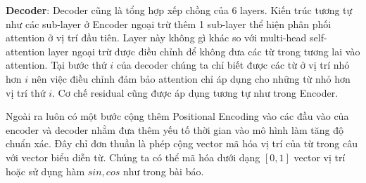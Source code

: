 \textbf{Decoder}: Decoder cũng là tổng hợp xếp chồng của 6 layers. Kiến trúc tương tự như các sub-layer ở Encoder ngoại trừ thêm 1 sub-layer thể hiện phân phối attention ở vị trí đầu tiên. Layer này không gì khác so với multi-head self-attention layer ngoại trừ được điều chỉnh để không đưa các từ trong tương lai vào attention. Tại bước thứ $i$ của decoder chúng ta chỉ biết được các từ ở vị trí nhỏ hơn $i$ nên việc điều chỉnh đảm bảo attention chỉ áp dụng cho những từ nhỏ hơn vị trí thứ $i$. Cơ chế residual cũng được áp dụng tương tự như trong Encoder.

Ngoài ra luôn có một bước cộng thêm Positional Encoding vào các đầu vào của encoder và decoder nhằm đưa thêm yếu tố thời gian vào mô hình làm tăng độ chuẩn xác. Đây chỉ đơn thuần là phép cộng vector mã hóa vị trí của từ trong câu với vector biểu diễn từ. Chúng ta có thể mã hóa dưới dạng $[0, 1]$ vector vị trí hoặc sử dụng hàm $sin,cos$ như trong bài báo.

